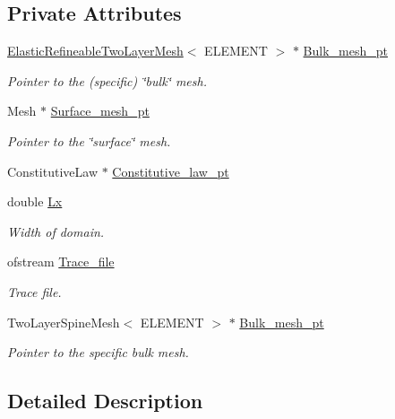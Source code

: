 \subsection*{Private Attributes}
\begin{DoxyCompactItemize}
\item 
\hyperlink{classElasticRefineableTwoLayerMesh}{Elastic\+Refineable\+Two\+Layer\+Mesh}$<$ E\+L\+E\+M\+E\+NT $>$ $\ast$ \hyperlink{classInterfaceProblem_ad7cdca485f230393096667bf0709ef8d}{Bulk\+\_\+mesh\+\_\+pt}
\begin{DoxyCompactList}\small\item\em Pointer to the (specific) \char`\"{}bulk\char`\"{} mesh. \end{DoxyCompactList}\item 
Mesh $\ast$ \hyperlink{classInterfaceProblem_a011c7b4f2307ff909f64dc158e8fc674}{Surface\+\_\+mesh\+\_\+pt}
\begin{DoxyCompactList}\small\item\em Pointer to the \char`\"{}surface\char`\"{} mesh. \end{DoxyCompactList}\item 
Constitutive\+Law $\ast$ \hyperlink{classInterfaceProblem_a5bf645cbdbf7775ab6438be324caf3c3}{Constitutive\+\_\+law\+\_\+pt}
\item 
double \hyperlink{classInterfaceProblem_a9b5070b479a79546b983bd7027917e93}{Lx}
\begin{DoxyCompactList}\small\item\em Width of domain. \end{DoxyCompactList}\item 
ofstream \hyperlink{classInterfaceProblem_a45e3bf3b44bcbeefab21a3598bef6179}{Trace\+\_\+file}
\begin{DoxyCompactList}\small\item\em Trace file. \end{DoxyCompactList}\item 
Two\+Layer\+Spine\+Mesh$<$ E\+L\+E\+M\+E\+NT $>$ $\ast$ \hyperlink{classInterfaceProblem_a1e9cf118e6c477ea9a1a49610bb72174}{Bulk\+\_\+mesh\+\_\+pt}
\begin{DoxyCompactList}\small\item\em Pointer to the specific bulk mesh. \end{DoxyCompactList}\end{DoxyCompactItemize}


\subsection{Detailed Description}
